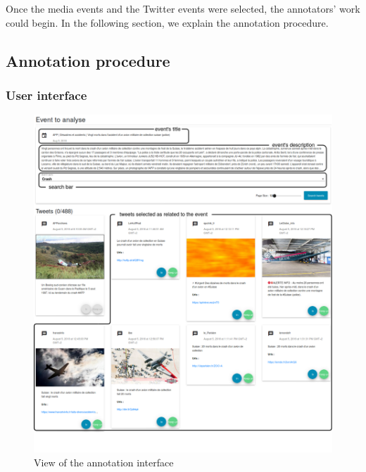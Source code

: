 Once the media events and the Twitter events were selected, the annotators' work could begin. In the following section, we explain the annotation procedure.
		\subsection{Annotation procedure}
		\subsubsection{User interface}
		
\begin{figure}
\begin{center}
\includegraphics[width=1\textwidth]{figures/Crash_with_comments.png}
\end{center}

\caption{View of the annotation interface}
\label{Figure:Interface}
\end{figure}
